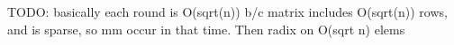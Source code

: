 TODO: basically each round is O(sqrt(n)) b/c matrix includes O(sqrt(n)) rows, and is sparse, so mm occur in that time.
Then radix on O(sqrt n) elems